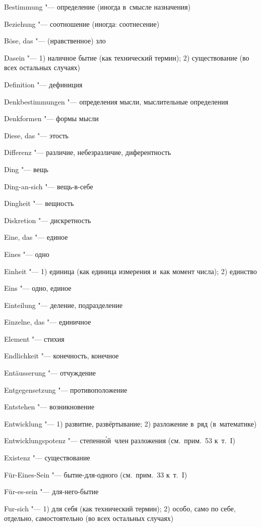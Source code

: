 \begin{multicols}{2}
Bestimmung "--- определение (иногда в~смысле назначения)

Beziehung "--- соотношение (иногда: соотнесение)

Böse, das "--- (нравственное) зло

\bigskip

Dasein "--- 1) наличное бытие (как технический термин); 2)
существование (во всех остальных случаях)

Definition "--- дефиниция

Denk\-bestim\-mun\-gen "--- определения мысли, мыслительные определения

Denkformen "--- формы мысли

Diese, das "--- этость

Differenz "--- различие, небезразличие, диферентность

Ding "--- вещь

Ding-an-sich "--- вещь-в-себе

Dingheit "--- вещность

Diskretion "--- дискретность

\bigskip

Eine, das "--- единое

Eines "--- одно

Einheit "--- 1) единица (как единица измерения и~как момент числа); 2) единство

Eins "--- одно, единое

Einteilung "--- деление, подразделение

Einzelne, das "--- единичное

Element "--- стихия

Endlichkeit "--- конечность, конечное

Entäus\-serung "--- отчуждение

Entgegen\-setzung "--- противоположение

Entstehen "--- возникновение

Entwicklung "--- 1) развитие, развёртывание; 2) разложение в~ряд (в~математике)

Ent\-wick\-lungs\-po\-tenz "--- степенн\'{о}й~член разложения
(см.~прим.~53 к~т.~I)

Existenz "--- существование

\bigskip

Für-Eines-Sein "--- бытие-для-одного (см.~прим.~33 к~т.~I)

Für-es-sein "--- для-него-бытие

Fur-sich "--- 1) для себя (как технический термин); 2) особо,
само по себе, отдельно, самостоятельно (во всех остальных случаях)


\end{multicols}
